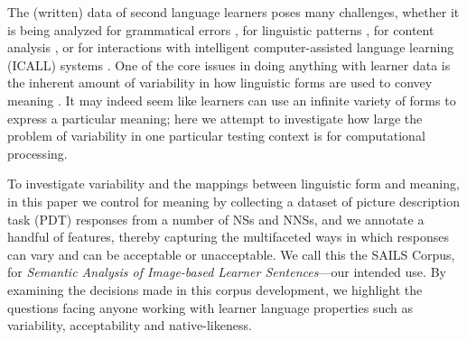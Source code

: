 \documentclass[11pt,a4paper]{article}
\begin{document}

The (written) data of second language learners poses many challenges, whether it is being analyzed for grammatical errors \citep{leacock:ea:14}, for linguistic patterns \citep{kyle2015automatically}, for content analysis \citep{weigle2013english}, or for interactions with intelligent computer-assisted language learning (ICALL) systems \citep{amaral:meurers:user:07}. One of the core issues in doing anything with learner data is the inherent amount of variability in how linguistic forms are used to convey meaning \citep[cf., e.g.,][]{Meurers.Dickinson-17}. It may indeed seem like learners can use an infinite variety of forms to express a particular meaning; here we attempt to investigate how large the problem of variability in one particular testing context is for computational processing. 

%
To investigate variability and the mappings between linguistic form and meaning, in this paper we control for meaning by collecting a dataset of picture
 description task (PDT) responses from a number of NSs and NNSs, and we annotate a handful of features, thereby capturing the multifaceted ways in which responses can vary and can be acceptable or unacceptable. We call this the SAILS Corpus, for \textit{Semantic Analysis of Image-based Learner Sentences}---our intended use. 
By examining the decisions made in this corpus development, we highlight the questions facing anyone working with learner language properties such as variability, acceptability and native-likeness. 
\end{document}
